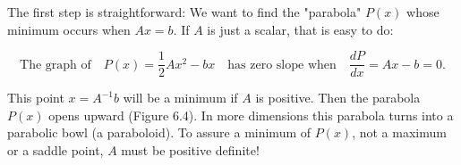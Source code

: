 The first step is straightforward: We want to find the "parabola" \(P(x)\) whose minimum occurs when \(Ax=b\). If \(A\) is just a scalar, that is easy to do:

\[\text{The graph of}\quad P(x)=\frac{1}{2}Ax^{2}-bx\quad\text{has zero slope when}\quad\frac{dP}{dx}=Ax-b=0.\]

This point \(x=A^{-1}b\) will be a minimum if \(A\) is positive. Then the parabola \(P(x)\) opens upward (Figure 6.4). In more dimensions this parabola turns into a parabolic bowl (a paraboloid). To assure a minimum of \(P(x)\), not a maximum or a saddle point, \(A\) must be positive definite!